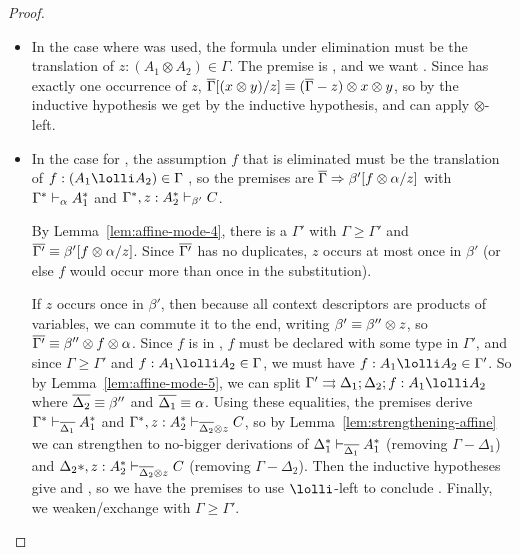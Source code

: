 \begin{proof}
\begin{itemize}
\item 
  In the case where \FL\/ was used, the formula under elimination must
  be the translation of $z:(A_1 \otimes A_2) \in \Gamma$. The premise is
  ,
  and we want .  Since \vars{\Gamma} has exactly one
  occurrence of $z$, $\overline{\Gamma}[(x \otimes y)/z] \equiv
  (\overline{\Gamma}-z)\otimes x \otimes y$, so by the inductive hypothesis
  we get  by the inductive hypothesis, and
  can apply $\otimes$-left.

\item In the case for \UL, the assumption $f$ that is eliminated must be
  the translation of $f:(A_1 \lolli A_2) \in \Gamma$ , so the premises
  are $\overline{\Gamma} \Rightarrow \beta'[f \otimes \alpha/z]$ with
  $\Gamma^* \vdash_{\alpha} A_1^*$ and
  $\Gamma^*,z:A_2^* \vdash_{\beta'} C$. 

  By Lemma~\ref{lem:affine-mode-4}, there is a $\Gamma'$ with $\Gamma
  \ge \Gamma'$ and $\overline{\Gamma'} \equiv \beta'[f \otimes \alpha/z]$.
  Since $\overline{\Gamma'}$ has no duplicates, $z$ occurs at most once in
  $\beta'$ (or else $f$ would occur more than once in the substitution).
  
  If $z$ occurs once in $\beta'$, then because all context descriptors
  are products of variables, we can commute it to the end, writing
  $\beta' \equiv \beta'' \otimes z$, so $\overline{\Gamma'} \equiv \beta''
  \otimes f \otimes \alpha$.  Since $f$ is in , $f$ must
  be declared with some type in $\Gamma'$, and since $\Gamma \ge
  \Gamma'$ and $f:A_1 \lolli A_2 \in \Gamma$, we must have $f:A_1 \lolli
  A_2 \in \Gamma'$.  So by Lemma~\ref{lem:affine-mode-5}, we can split
  $\Gamma' \splits \Delta_1;\Delta_2;f:A_1 \lolli A_2$ where
  $\overline{\Delta_2} \equiv \beta''$ and $\overline{\Delta_1} \equiv \alpha$.
  Using these equalities, the premises derive
  $\Gamma^* \vdash_{\overline{\Delta_1}} A_1^*$ and
  $\Gamma^*,z:A_2^* \vdash_{\overline{\Delta_2} \otimes z} C$, so by
  Lemma~\ref{lem:strengthening-affine} we can strengthen to no-bigger
  derivations of
  $\Delta_1^* \vdash_{\overline{\Delta_1}} A_1^*$ (removing $\Gamma-\Delta_1$) and
  $\Delta_2*,z:A_2^* \vdash_{\overline{\Delta_2} \otimes z} C$ (removing $\Gamma-\Delta_2$).
  Then the inductive hypotheses give  and
  , so we have the premises to use $\lolli$-left
  to conclude .  Finally, we weaken/exchange with
  $\Gamma \ge \Gamma'$.


\end{itemize}
\end{proof}
